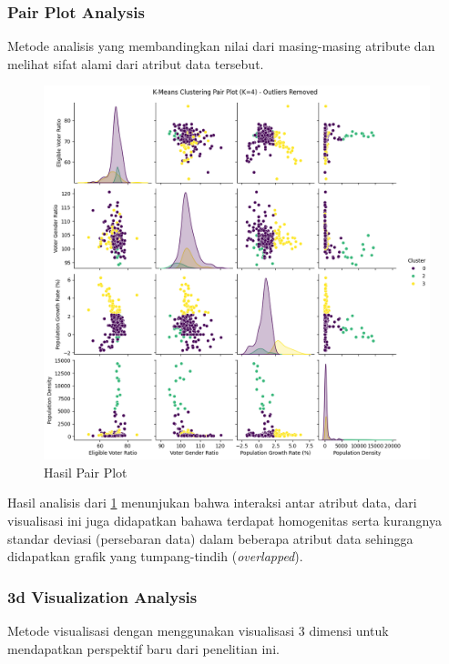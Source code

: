 \subsubsection{Pair Plot Analysis}
Metode analisis yang membandingkan nilai dari masing-masing atribute dan melihat sifat alami dari atribut data tersebut.
\begin{figure}[h]
    \centering
    \includegraphics[width=1\linewidth]{images/pair_plot_analysis.png}
    \caption{Hasil Pair Plot}
    \label{fig:pair_plot}
\end{figure}
Hasil analisis dari \ref{fig:pair_plot} menunjukan bahwa interaksi antar atribut data, dari visualisasi ini juga didapatkan bahawa terdapat homogenitas serta kurangnya standar deviasi (persebaran data) dalam beberapa atribut data sehingga didapatkan grafik yang tumpang-tindih (\textit{overlapped}).

\subsubsection{3d Visualization Analysis}
Metode visualisasi dengan menggunakan visualisasi 3 dimensi untuk mendapatkan perspektif baru dari penelitian ini.

